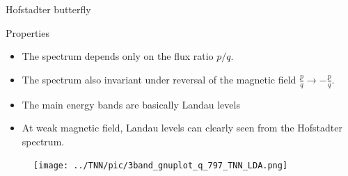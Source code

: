 \documentclass[aspectratio=169,compress,x11names]{beamer}
\begin{document}
 	\begin{frame}{Hofstadter butterfly}
		\begin{multicols}{2}
			\begin{minipage}{\columnwidth}
				\begin{block}{Properties}
					\begin{itemize}
						\item The spectrum depends only on the flux ratio $p/q$.
						\item The spectrum also invariant under reversal of the magnetic field $\tfrac{p}{q} \to -\tfrac{p}{q}$.
						\item The main energy bands are basically Landau levels
						\item At weak magnetic field, Landau levels can clearly seen from the Hofstadter spectrum.
					\end{itemize}
				\end{block}
			\end{minipage}
			\begin{minipage}{\columnwidth}
				\begin{figure}
					\centering
					\texttt{[image: ../TNN/pic/3band\_gnuplot\_q\_797\_TNN\_LDA.png]}
				\end{figure}
			\end{minipage}
		\end{multicols}
	\end{frame}
\end{document}
